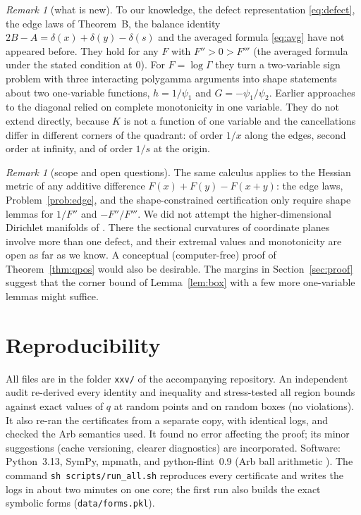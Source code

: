\documentclass[11pt,a4paper]{article}
\theoremstyle{definition}
\theoremstyle{remark}
\newtheorem{remark}[theorem]{Remark}
\begin{document}
\begin{remark}[what is new]
To our knowledge, the defect representation \eqref{eq:defect}, the edge laws of Theorem~B, the balance identity $2B-A=\delta(x)+\delta(y)-\delta(s)$ and the averaged formula \eqref{eq:avg} have not appeared before. They hold for any $F$ with $F''>0>F'''$ (the averaged formula under the stated condition at $0$). For $F=\log\Gamma$ they turn a two-variable sign problem with three interacting polygamma arguments into shape statements about two one-variable functions, $h=1/\psi_1$ and $G=-\psi_1/\psi_2$. Earlier approaches to the diagonal \cite{Qi21,QA24,Qi26} relied on complete monotonicity in one variable. They do not extend directly, because $K$ is not a function of one variable and the cancellations differ in different corners of the quadrant: of order $1/x$ along the edges, second order at infinity, and of order $1/s$ at the origin.
\end{remark}

\begin{remark}[scope and open questions]
The same calculus applies to the Hessian metric of any additive difference $F(x)+F(y)-F(x+y)$: the edge laws, Problem~\ref{prob:edge}, and the shape-constrained certification only require shape lemmas for $1/F''$ and $-F''/F'''$. We did not attempt the higher-dimensional Dirichlet manifolds of \cite{LBPP21}. There the sectional curvatures of coordinate planes involve more than one defect, and their extremal values and monotonicity are open as far as we know. A conceptual (computer-free) proof of Theorem~\ref{thm:qpos} would also be desirable. The margins in Section~\ref{sec:proof} suggest that the corner bound of Lemma~\ref{lem:box} with a few more one-variable lemmas might suffice.
\end{remark}

\appendix
\section{Reproducibility}\label{app:repro}
All files are in the folder \texttt{xxv/} of the accompanying repository. An independent audit re-derived every identity and inequality and stress-tested all region bounds against exact values of $q$ at random points and on random boxes (no violations). It also re-ran the certificates from a separate copy, with identical logs, and checked the Arb semantics used. It found no error affecting the proof; its minor suggestions (cache versioning, clearer diagnostics) are incorporated. Software: Python~3.13, SymPy, mpmath, and python-flint~0.9 (Arb ball arithmetic \cite{Joh17}). The command \texttt{sh scripts/run\_all.sh} reproduces every certificate and writes the logs in about two minutes on one core; the first run also builds the exact symbolic forms (\texttt{data/forms.pkl}).
\end{document}
